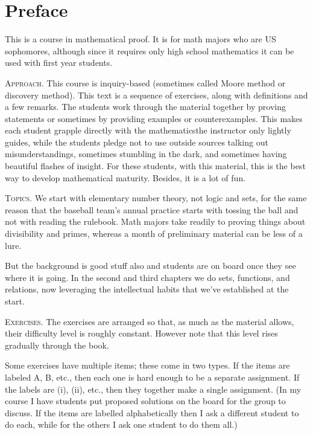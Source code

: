 \chapter*{Preface}

This is a course in mathematical proof. 
It is for math majors who are US sophomores, although since
it requires only high school mathematics
it can be used with first year students.



\medskip
\noindent\textsc{Approach.}
This course is inquiry-based (sometimes called Moore method 
or discovery method).
This text is a sequence of exercises,
along with definitions and a few remarks.
The students work through the material together by
proving statements or sometimes by providing examples or counterexamples.
This makes each student grapple directly with the 
mathematics\Dash the instructor only 
lightly guides, while the students pledge not to use outside sources\Dash
talking out misunderstandings, 
sometimes stumbling in the dark, and sometimes
having beautiful flashes of insight.
For these students, with this material,
this is the best way to develop mathematical maturity.
Besides, it is a lot of fun.


\medskip
\noindent\textsc{Topics.}
We start with elementary number theory, not logic and sets, 
for the same reason
that the baseball team's annual practice starts with tossing the ball and 
not with reading the rulebook.
Math majors take readily to proving things about
divisibility and primes, 
whereas a month of preliminary material can be less of a lure.

But the background is good stuff also and 
students are on board once they see where it is going.
In the second and third chapters we do
sets, functions, and relations, now leveraging the
intellectual habits that we've established at the start.



\medskip
\noindent\textsc{Exercises.}
The exercises are arranged so that, as much as the material allows,
their difficulty level is roughly constant.
However note that this level rises gradually  
through the book.

Some exercises have multiple items; these come in two types.
If the items are labeled \textsc{A}, \textsc{B}, etc., 
then each one is hard enough to be a separate assignment.
If the labels are (i), (ii), etc., then they together make
a single assignment.
(In my course I have students put proposed solutions on the board
for the group to discuss.
If the items are labelled alphabetically then I ask a different student
to do each, while for the others I ask one student to do them all.)



